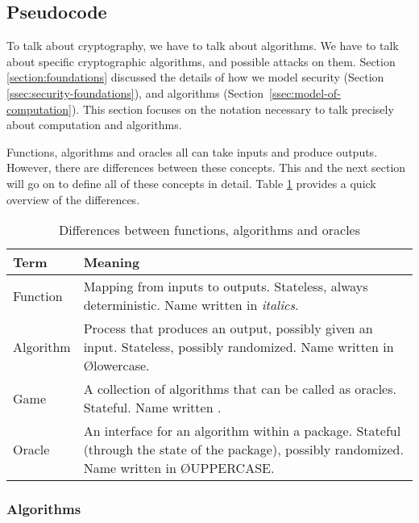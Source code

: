\subsection{Pseudocode}\label{ssec:pseudocode-defs}
To talk about cryptography, we have to talk about algorithms. We have to talk about specific cryptographic algorithms, and possible attacks on them. Section \ref{section:foundations} discussed the details of how we model security (Section \ref{ssec:security-foundations}), and algorithms (Section~\ref{ssec:model-of-computation}). This section focuses on the notation necessary to talk precisely about computation and algorithms.

Functions, algorithms and oracles all can take inputs and produce outputs. However, there are differences between these concepts. This and the next section will go on to define all of these concepts in detail. Table \ref{table:functions-algorithms-oracles} provides a quick overview of the differences.

\begin{table}
\begin{center}
\begin{tabular}{l|p{11cm}}
  Term & Meaning \\ \hline
  Function & Mapping from inputs to outputs. Stateless, always deterministic. Name written in \emph{italics}.\\
  Algorithm & Process that produces an output, possibly given an input. Stateless, possibly randomized. Name written in \O{lowercase}.\\
  Game & A collection of algorithms that can be called as oracles. Stateful. Name written \M{Capitalized}. \\
  Oracle & An interface for an algorithm within a package. Stateful (through the state of the package), possibly randomized. Name written in \O{UPPERCASE}.\\
\end{tabular}
\end{center}
\caption{Differences between functions, algorithms and oracles}\label{table:functions-algorithms-oracles}
\end{table}

\subsubsection{Algorithms}

